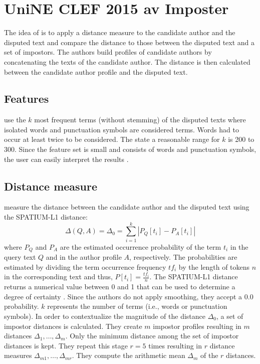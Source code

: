 \section{UniNE CLEF 2015 \ac{av} Imposter}
\label{sec:UniNE_CLEF2015_AV_impostor}

The idea of \citet{kocher_unine_2015} is to apply a distance measure to the candidate author and the disputed text and 
compare the distance to those between the disputed text and a set of impostors.
The authors build profiles of candidate authors by concatenating the texts of the candidate author.
The distance is then calculated between the candidate author profile and the disputed text.

\subsection{Features}

\citet{kocher_unine_2015} use the $k$ most frequent terms (without stemming) of the disputed texts 
where isolated words and punctuation symbols are considered terms.
Words had to occur at least twice to be considered.
The state a reasonable range for $k$ is 200 to 300.
Since the feature set is small and consists of words and punctuation symbols, 
the user can easily interpret the results \citep{kocher_unine_2015}.


\subsection{Distance measure}
\newcommand{\spldist}{SPATIUM-L1}

\citet{kocher_unine_2015} measure the distance between the candidate author and the disputed text using the \spldist{} distance:
$$\Delta(Q,A)=\Delta_0=\sum_{i=1}^{k}\left| P_Q\left[ t_i \right] -P_A\left[ t_i \right] \right|$$
where $P_Q$ and $P_A$ are the estimated occurrence probability of the term $t_i$ in the query text $Q$ and in the author profile $A$, respectively.
The probabilities are estimated by dividing the term occurrence frequency $tf_i$ by the length of tokens $n$ in the corresponding text and thus, 
$P\left[ t_i \right]=\frac{tf_i}{n}$.
The \spldist{} distance returns a numerical value between 0 and 1 that can be used to determine a degree of certainty \citep{kocher_unine_2015}.
Since the authors do not apply smoothing, they accept a 0.0 probability.
$k$ represents the number of terms (i.e., words or punctuation symbols).
In order to contextualize the magnitude of the distance $\Delta_0$, a set of impostor distances is calculated.
They create $m$ impostor profiles resulting in $m$ distances $\Delta_1, \ldots, \Delta_m$.
Only the minimum distance among the set of impostor distances is kept.
They repeat this stage $r=5$ times resulting in $r$ distance measures $\Delta_{m1}, \ldots, \Delta_{mr}$.
They compute the arithmetic mean $\Delta_m$ of the $r$ distances.

